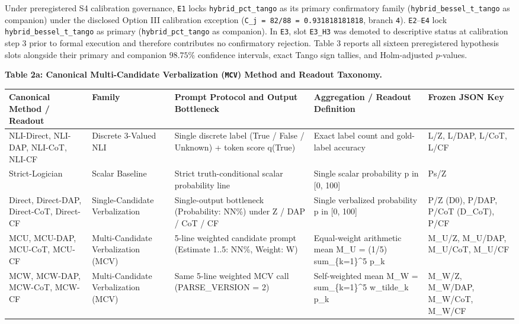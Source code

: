 \documentclass[11pt,a4paper]{article}
\begin{document}
Under preregistered S4 calibration governance, \texttt{E1} locks \texttt{hybrid\_\allowbreak{}pct\_\allowbreak{}tango} as its primary confirmatory family (\texttt{hybrid\_\allowbreak{}bessel\_\allowbreak{}t\_\allowbreak{}tango} as companion) under the disclosed Option III calibration exception (\texttt{C\_\allowbreak{}j =\allowbreak{} 82/\allowbreak{}88 =\allowbreak{} 0.931818181818}, branch \texttt{4}). \texttt{E2}--\texttt{E4} lock \texttt{hybrid\_\allowbreak{}bessel\_\allowbreak{}t\_\allowbreak{}tango} as primary (\texttt{hybrid\_\allowbreak{}pct\_\allowbreak{}tango} as companion). In \texttt{E3}, slot \texttt{E3\_\allowbreak{}H3} was demoted to descriptive status at calibration step 3 prior to formal execution and therefore contributes no confirmatory rejection. Table 3 reports all sixteen preregistered hypothesis slots alongside their primary and companion $98.75\%$ confidence intervals, exact Tango sign tallies, and Holm-adjusted $p$-values.

\textbf{Table 2a: Canonical Multi-Candidate Verbalization (\texttt{MCV}) Method and Readout Taxonomy.}

\begin{center}\begingroup\small\setlength{\tabcolsep}{4.5pt}\renewcommand{\arraystretch}{1.12}\begin{adjustbox}{max width=\textwidth}\begin{tabular}{lllll}\toprule
\textbf{Canonical Method / Readout} & \textbf{Family} & \textbf{Prompt Protocol and Output Bottleneck} & \textbf{Aggregation / Readout Definition} & \textbf{Frozen JSON Key} \\ \midrule
NLI-Direct, NLI-DAP, NLI-CoT, NLI-CF & Discrete 3-Valued NLI & Single discrete label (True / False / Unknown) + token score q(True) & Exact label count and gold-label accuracy & L/Z, L/DAP, L/CoT, L/CF \\
Strict-Logician & Scalar Baseline & Strict truth-conditional scalar probability line & Single scalar probability p in [0, 100] & Ps/Z \\
Direct, Direct-DAP, Direct-CoT, Direct-CF & Single-Candidate Verbalization & Single-output bottleneck (Probability: NN\%) under Z / DAP / CoT / CF & Single verbalized probability p in [0, 100] & P/Z (D0), P/DAP, P/CoT (D\_\allowbreak{}CoT), P/CF \\
MCU, MCU-DAP, MCU-CoT, MCU-CF & Multi-Candidate Verbalization (MCV) & 5-line weighted candidate prompt (Estimate 1..5: NN\%, Weight: W) & Equal-weight arithmetic mean M\_\allowbreak{}U = (1/5) sum\_\allowbreak{}\{k=1\}\textasciicircum{}5 p\_\allowbreak{}k & M\_\allowbreak{}U/Z, M\_\allowbreak{}U/DAP, M\_\allowbreak{}U/CoT, M\_\allowbreak{}U/CF \\
MCW, MCW-DAP, MCW-CoT, MCW-CF & Multi-Candidate Verbalization (MCV) & Same 5-line weighted MCV call (PARSE\_\allowbreak{}VERSION = 2) & Self-weighted mean M\_\allowbreak{}W = sum\_\allowbreak{}\{k=1\}\textasciicircum{}5 w\_\allowbreak{}tilde\_\allowbreak{}k p\_\allowbreak{}k & M\_\allowbreak{}W/Z, M\_\allowbreak{}W/DAP, M\_\allowbreak{}W/CoT, M\_\allowbreak{}W/CF \\
\bottomrule\end{tabular}\end{adjustbox}\endgroup\end{center}
\end{document}
